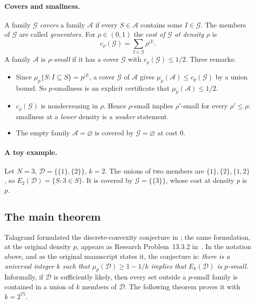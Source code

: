 \documentclass[11pt,letterpaper]{article}
\theoremstyle{definition}
\theoremstyle{remark}
\numberwithin{equation}{section}
\begin{document}
\paragraph{Covers and smallness.}
A family $\mathcal G$ \emph{covers} a family $\mathcal A$ if every
$S\in\mathcal A$ contains some $I\in\mathcal G$. The members of
$\mathcal G$ are called \emph{generators}. For $\rho\in(0,1)$ the
\emph{cost of $\mathcal G$ at density $\rho$} is
\[
c_\rho(\mathcal G)=\sum_{I\in\mathcal G}\rho^{|I|}.
\]
A family $\mathcal A$ is \emph{$\rho$-small} if it has a cover
$\mathcal G$ with $c_\rho(\mathcal G)\le1/2$. Three remarks:
\begin{itemize}
\item Since $\mu_p\{S:I\subseteq S\}=p^{|I|}$, a cover $\mathcal G$ of
$\mathcal A$ gives $\mu_p(\mathcal A)\le c_p(\mathcal G)$ by a union bound.
So $p$-smallness is an explicit certificate that $\mu_p(\mathcal A)\le1/2$.
\item $c_\rho(\mathcal G)$ is nondecreasing in $\rho$. Hence
$\rho$-small implies $\rho'$-small for every $\rho'\le\rho$:
smallness at a \emph{lower} density is a \emph{weaker} statement.
\item The empty family $\mathcal A=\varnothing$ is covered by
$\mathcal G=\varnothing$ at cost $0$.
\end{itemize}

\paragraph{A toy example.}
Let $N=3$, $\mathcal D=\{\{1\},\{2\}\}$, $k=2$. The unions of two members
are $\{1\},\{2\},\{1,2\}$, so $E_2(\mathcal D)=\{S:3\in S\}$. It is
covered by $\mathcal G=\{\{3\}\}$, whose cost at density $p$ is $p$.

\subsection{The main theorem}

Talagrand formulated the discrete-convexity conjecture in
\cite[Conjecture~7.1]{Talagrand10}; the same formulation, at the original
density $p$, appears as Research Problem~13.3.2 in~\cite{Talagrand21}.
In the notation above, and as the original manuscript states it, the
conjecture is: \emph{there is a universal integer $k$ such that
$\mu_p(\mathcal D)\ge1-1/k$ implies that $E_k(\mathcal D)$ is $p$-small.}
Informally, if $\mathcal D$ is sufficiently likely, then every set outside
a $p$-small family is contained in a union of $k$ members of $\mathcal D$.
The following theorem proves it with $k=2^{75}$.
\end{document}
